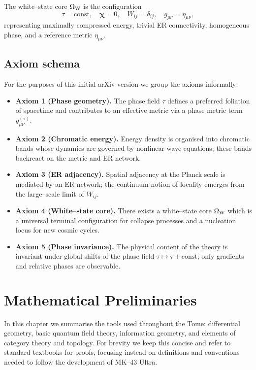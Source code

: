 \begin{definition}
The white--state core $\Omega_{\mathrm{W}}$ is the configuration
\[
  \tau = \text{const}, \quad \bm{\chi}=0, \quad W_{ij} = \delta_{ij}, \quad g_{\mu\nu} = \eta_{\mu\nu},
\]
representing maximally compressed energy, trivial ER connectivity, homogeneous phase, and a reference metric $\eta_{\mu\nu}$.
\end{definition}

\section{Axiom schema}

For the purposes of this initial arXiv version we group the axioms informally:

\begin{itemize}
  \item \textbf{Axiom 1 (Phase geometry).} The phase field $\tau$ defines a preferred foliation of spacetime and contributes to an effective metric via a phase metric term $g^{(\tau)}_{\mu\nu}$.
  \item \textbf{Axiom 2 (Chromatic energy).} Energy density is organised into chromatic bands whose dynamics are governed by nonlinear wave equations; these bands backreact on the metric and ER network.
  \item \textbf{Axiom 3 (ER adjacency).} Spatial adjacency at the Planck scale is mediated by an ER network; the continuum notion of locality emerges from the large--scale limit of $W_{ij}$.
  \item \textbf{Axiom 4 (White--state core).} There exists a white--state core $\Omega_{\mathrm{W}}$ which is a universal terminal configuration for collapse processes and a nucleation locus for new cosmic cycles.
  \item \textbf{Axiom 5 (Phase invariance).} The physical content of the theory is invariant under global shifts of the phase field $\tau \mapsto \tau + \text{const}$; only gradients and relative phases are observable.
\end{itemize}

\chapter{Mathematical Preliminaries}

In this chapter we summarise the tools used throughout the Tome: differential geometry, basic quantum field theory, information geometry, and elements of category theory and topology.
For brevity we keep this concise and refer to standard textbooks for proofs, focusing instead on definitions and conventions needed to follow the development of MK--43 Ultra.

